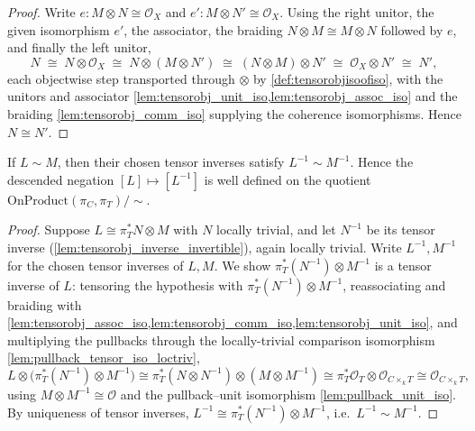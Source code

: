 \begin{proof}
  \leanok
  Write \(e : M \otimes N \cong \mathcal{O}_X\) and
  \(e' : M \otimes N' \cong \mathcal{O}_X\). Using the right unitor, the given
  isomorphism \(e'\), the associator, the braiding
  \(N \otimes M \cong M \otimes N\) followed by \(e\), and finally the left
  unitor,
  \[
    N \;\cong\; N \otimes \mathcal{O}_X
      \;\cong\; N \otimes (M \otimes N')
      \;\cong\; (N \otimes M) \otimes N'
      \;\cong\; \mathcal{O}_X \otimes N'
      \;\cong\; N' ,
  \]
  each objectwise step transported through \(\otimes\) by
  \cref{def:tensorobjisoofiso}, with the unitors and associator
  \cref{lem:tensorobj_unit_iso,lem:tensorobj_assoc_iso} and the braiding
  \cref{lem:tensorobj_comm_iso} supplying the coherence isomorphisms. Hence
  \(N \cong N'\).
\end{proof}

\begin{lemma}
  \label{lem:relpic_rel_neg}
  If \(L \sim M\), then their chosen tensor inverses satisfy \(L^{-1} \sim
  M^{-1}\). Hence the descended negation \([L] \mapsto [L^{-1}]\) is well defined
  on the quotient \(\mathrm{OnProduct}(\pi_C, \pi_T) / {\sim}\).
\end{lemma}

\begin{proof}
  \leanok
  Suppose \(L \cong \pi_T^* N \otimes M\) with \(N\) locally trivial, and let
  \(N^{-1}\) be its tensor inverse (\cref{lem:tensorobj_inverse_invertible}),
  again locally trivial. Write \(L^{-1}, M^{-1}\) for the chosen tensor inverses
  of \(L, M\). We show \(\pi_T^*(N^{-1}) \otimes M^{-1}\) is a tensor inverse of
  \(L\): tensoring the hypothesis with \(\pi_T^*(N^{-1}) \otimes M^{-1}\),
  reassociating and braiding with
  \cref{lem:tensorobj_assoc_iso,lem:tensorobj_comm_iso,lem:tensorobj_unit_iso},
  and multiplying the pullbacks through the locally-trivial comparison
  isomorphism \cref{lem:pullback_tensor_iso_loctriv},
  \[
    L \otimes \bigl(\pi_T^*(N^{-1}) \otimes M^{-1}\bigr)
      \cong \pi_T^*(N \otimes N^{-1}) \otimes (M \otimes M^{-1})
      \cong \pi_T^* \mathcal{O}_T \otimes \mathcal{O}_{C \times_k T}
      \cong \mathcal{O}_{C \times_k T} ,
  \]
  using \(M \otimes M^{-1} \cong \mathcal{O}\) and the pullback--unit
  isomorphism \cref{lem:pullback_unit_iso}. By uniqueness of tensor inverses,
  \(L^{-1} \cong \pi_T^*(N^{-1}) \otimes M^{-1}\), i.e.\ \(L^{-1} \sim M^{-1}\).
\end{proof}

